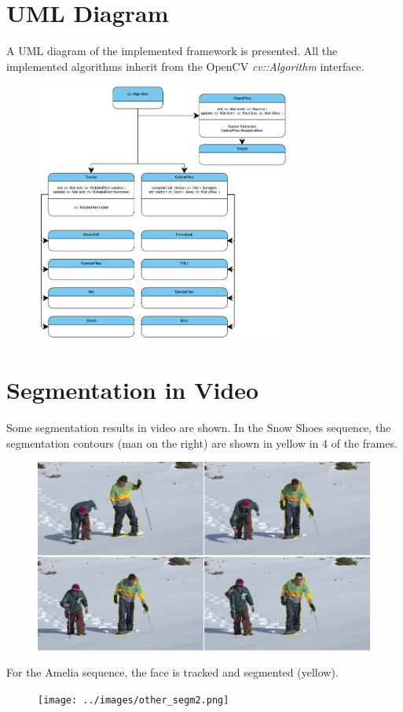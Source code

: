 \appendix
\chapter{UML Diagram}

A UML diagram of the implemented framework is presented. All the implemented algorithms 
inherit from the OpenCV {\it cv::Algorithm} interface.

   \begin{figure}[thbp]
      \centering
      \includegraphics[width=0.75\textwidth]{../images/ClassDiagram.png}
      \label{class}
   \end{figure}
   
\chapter{Segmentation in Video}
\label{app:seg}
Some segmentation results in video are shown. In the Snow Shoes sequence, the 
segmentation contours (man on the right) are shown in yellow in 4 of the frames.

   \begin{figure}[thbp]
      \centering
      \includegraphics[width=1.00\textwidth]{../images/other_segm1.png}
      \label{othersegm1}
   \end{figure}

For the Amelia sequence, the face is tracked and segmented (yellow).

   \begin{figure}[thbp]
      \centering
      \texttt{[image: ../images/other\_segm2.png]}
      \label{othersegm1}
   \end{figure}
